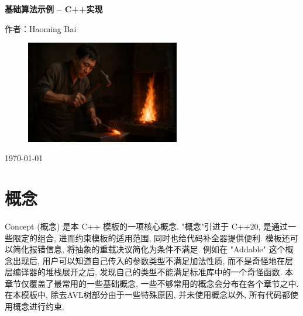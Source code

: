 \documentclass[a4paper]{ctexbook}
\begin{document}
\begin{titlepage}
	\centering
	\vspace*{2cm}


	{\Huge\bfseries 基础算法示例 -- C++实现\par}
	\vspace{2cm}
	{\Large 作者：Haoming Bai\par}
	\vfill

	\begin{figure}[h]
		\centering
		\includegraphics[width=0.6\textwidth]{./blacksimithing.png}
	\end{figure}
	\vfill

	{\large \today\par}
\end{titlepage}

\clearpage
{}
\tableofcontents
\clearpage

\mainmatter

\chapter{概念}

Concept (概念) 是本 C++ 模板的一项核心概念. "概念"引进于 C++20, 是通过一些限定的组合, 进而约束模板的适用范围, 同时也给代码补全器提供便利. 模板还可以简化报错信息, 将抽象的重载决议简化为条件不满足. 例如在 "Addable" 这个概念出现后, 用户可以知道自己传入的参数类型不满足加法性质, 而不是奇怪地在层层编译器的堆栈展开之后, 发现自己的类型不能满足标准库中的一个奇怪函数. 本章节仅覆盖了最常用的一些基础概念, 一些不够常用的概念会分布在各个章节之中. 在本模板中, 除去AVL树部分由于一些特殊原因, 并未使用概念以外, 所有代码都使用概念进行约束.
\end{document}
